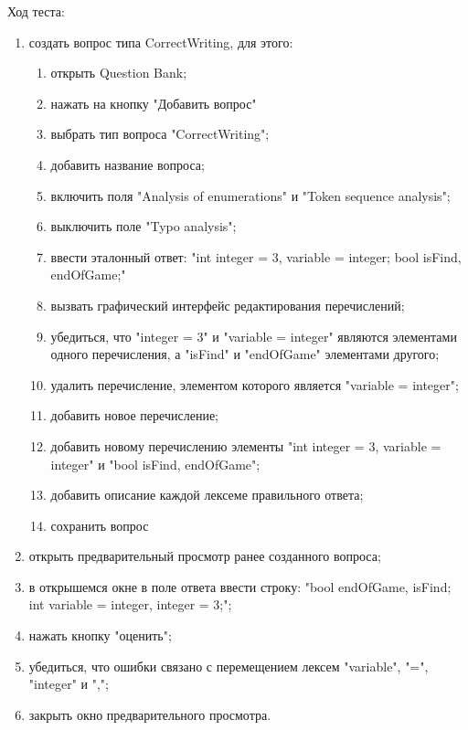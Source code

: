 \documentclass[a4paper,english]{G2-105}
\begin{document}
\par Ход теста: 
\begin{enumerate}
    \item создать вопрос типа CorrectWriting, для этого:
        \begin{enumerate}
            \item открыть Question Bank;
            \item нажать на кнопку "Добавить вопрос"
            \item выбрать тип вопроса "CorrectWriting";
            \item добавить название вопроса;
            \item включить поля "Analysis of enumerations" и "Token sequence analysis";
            \item выключить поле "Typo analysis";
            \item ввести эталонный ответ: "int integer = 3, variable = integer; bool isFind, endOfGame;"
            \item вызвать графический интерфейс редактирования перечислений;
            \item убедиться, что "integer = 3" и "variable = integer" являются элементами одного перечисления, а "isFind" и "endOfGame" элементами другого;
            \item удалить перечисление, элементом которого является "variable = integer";
            \item добавить новое перечисление;
            \item добавить новому перечислению элементы "int integer = 3, variable = integer" и "bool isFind, endOfGame";
            \item добавить описание каждой лексеме правильного ответа;
            \item сохранить вопрос
        \end{enumerate}
    \item открыть предварительный просмотр ранее созданного вопроса;
    \item в открышемся окне в поле ответа ввести строку: "bool endOfGame, isFind; int variable = integer, integer = 3;";
    \item нажать кнопку "оценить";
    \item убедиться, что ошибки связано с перемещением лексем "variable", "=", "integer" и ",";
    \item закрыть окно предварительного просмотра.
\end{enumerate}
\end{document}
